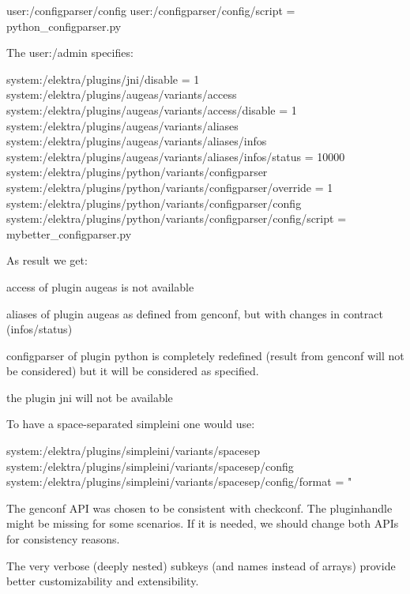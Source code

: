 \begin{DoxyCode}
user:/configparser/config
user:/configparser/config/script = python\_configparser.py
\end{DoxyCode}


The user\+:/admin specifies\+:


\begin{DoxyCode}
system:/elektra/plugins/jni/disable = 1
system:/elektra/plugins/augeas/variants/access
system:/elektra/plugins/augeas/variants/access/disable = 1
system:/elektra/plugins/augeas/variants/aliases
system:/elektra/plugins/augeas/variants/aliases/infos
system:/elektra/plugins/augeas/variants/aliases/infos/status = 10000
system:/elektra/plugins/python/variants/configparser
system:/elektra/plugins/python/variants/configparser/override = 1
system:/elektra/plugins/python/variants/configparser/config
system:/elektra/plugins/python/variants/configparser/config/script = mybetter\_configparser.py
\end{DoxyCode}


As result we get\+:


\begin{DoxyEnumerate}
\item {\ttfamily access} of plugin {\ttfamily augeas} is not available
\item {\ttfamily aliases} of plugin {\ttfamily augeas} as defined from {\ttfamily genconf}, but with changes in contract ({\ttfamily infos/status})
\item {\ttfamily configparser} of plugin {\ttfamily python} is completely redefined (result from {\ttfamily genconf} will not be considered) but it will be considered as specified.
\item the plugin {\ttfamily jni} will not be available
\end{DoxyEnumerate}

To have a space-\/separated simpleini one would use\+:


\begin{DoxyCode}
system:/elektra/plugins/simpleini/variants/spacesep
system:/elektra/plugins/simpleini/variants/spacesep/config
system:/elektra/plugins/simpleini/variants/spacesep/config/format = "%
\end{DoxyCode}



\begin{DoxyItemize}
\item The {\ttfamily genconf} A\+PI was chosen to be consistent with {\ttfamily checkconf}. The pluginhandle might be missing for some scenarios. If it is needed, we should change both A\+P\+Is for consistency reasons.
\item The very verbose (deeply nested) subkeys (and names instead of arrays) provide better customizability and extensibility.
\end{DoxyItemize}


